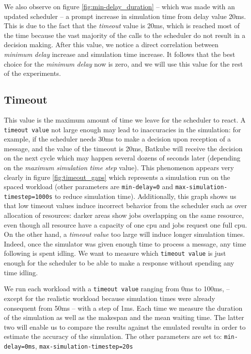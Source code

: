 We also observe on figure \ref{fig:min-delay_duration} -- which was made with
an updated scheduler -- a prompt increase in simulation time from delay value
20ms. This is due to the fact that the \textit{timeout} value is 20ms, which is
reached most of the time because the vast majority of the calls to the
scheduler do not result in a decision making. After this value, we notice a
direct correlation between \textit{minimum delay} increase and simulation time
increase. It follows that the best choice for the \textit{minimum delay} now is
zero, and we will use this value for the rest of the experiments.

\subsection{Timeout}

This value is the maximum amount of time we leave for the scheduler to react. A
\texttt{timeout value} not large enough may lead to inaccuracies in the
simulation: for example, if the scheduler needs 30ms to make a decision upon
reception of a message, and the value of the timeout is 20ms, Batkube will
receive the decision on the next cycle which may happen several dozens of
seconds later (depending on the \textit{maximum simulation time step} value).
This phenomenon appears very clearly in figure \ref{fig:timeout_gaps} which
represents a simulation run on the spaced workload (other parameters are
\texttt{min-delay=0} and \texttt{max-simulation-timestep=1000s} to reduce
simulation time). Additionally, this graph shows us that low timeout values
induce incorrect behavior from the scheduler such as over allocation of
resources: darker areas show jobs overlapping on the same resource, even though
all resource have a capacity of one cpu and jobs request one full cpu.  On the
other hand, a \textit{timeout value} too large will induce longer simulation
times. Indeed, once the simulator was given enough time to process a message,
any time following is spent idling. We want to measure which \texttt{timeout
value} is just enough for the scheduler to be able to make a response without
spending any time idling.

We run each workload with a \texttt{timeout value} ranging from 0ms to 100ms,
--except for the realistic workload because simulation times were already
consequent from 50ms -- with a step of 1ms. Each time we measure the duration
of the simulation as well as the makespan and the mean waiting time. The latter
two will enable us to compare the results against the emulated results in order
to estimate the accuracy of the simulation. The other parameters are set to:
\texttt{min-delay=0ms}, \texttt{max-simulation-timestep=20s}

